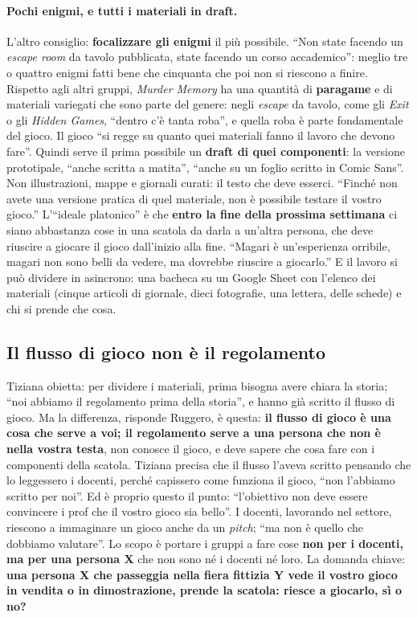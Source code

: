 \paragraph{Pochi enigmi, e tutti i materiali in draft.} L'altro consiglio: \textbf{focalizzare
gli enigmi} il più possibile. ``Non state facendo un \emph{escape room} da tavolo
pubblicata, state facendo un corso accademico'': meglio tre o quattro enigmi fatti bene che
cinquanta che poi non si riescono a finire. Rispetto agli altri gruppi, \emph{Murder Memory}
ha una quantità di \textbf{paragame} e di materiali variegati che sono parte del genere:
negli \emph{escape} da tavolo, come gli \emph{Exit} o gli \emph{Hidden Games}, ``dentro c'è
tanta roba'', e quella roba è parte fondamentale del gioco. Il gioco ``si regge su quanto
quei materiali fanno il lavoro che devono fare''. Quindi serve il prima possibile un
\textbf{draft di quei componenti}: la versione prototipale, ``anche scritta a matita'',
``anche su un foglio scritto in Comic Sans''. Non illustrazioni, mappe e giornali curati:
il testo che deve esserci. ``Finché non avete una versione pratica di quel materiale, non
è possibile testare il vostro gioco.'' L'``ideale platonico'' è che \textbf{entro la fine
della prossima settimana} ci siano abbastanza cose in una scatola da darla a un'altra
persona, che deve riuscire a giocare il gioco dall'inizio alla fine. ``Magari è
un'esperienza orribile, magari non sono belli da vedere, ma dovrebbe riuscire a giocarlo.''
E il lavoro si può dividere in asincrono: una bacheca su un Google Sheet con l'elenco dei
materiali (cinque articoli di giornale, dieci fotografie, una lettera, delle schede) e
chi si prende che cosa.

\subsection{Il flusso di gioco non è il regolamento}

Tiziana obietta: per dividere i materiali, prima bisogna avere chiara la storia; ``noi
abbiamo il regolamento prima della storia'', e hanno già scritto il flusso di gioco. Ma la
differenza, risponde Ruggero, è questa: \textbf{il flusso di gioco è una cosa che serve a
voi; il regolamento serve a una persona che non è nella vostra testa}, non conosce il
gioco, e deve sapere che cosa fare con i componenti della scatola. Tiziana precisa che il
flusso l'aveva scritto pensando che lo leggessero i docenti, perché capissero come funziona
il gioco, ``non l'abbiamo scritto per noi''. Ed è proprio questo il punto: ``l'obiettivo
non deve essere convincere i prof che il vostro gioco sia bello''. I docenti, lavorando nel
settore, riescono a immaginare un gioco anche da un \emph{pitch}; ``ma non è quello che
dobbiamo valutare''. Lo scopo è portare i gruppi a fare cose \textbf{non per i docenti, ma
per una persona X} che non sono né i docenti né loro. La domanda chiave: \textbf{una
persona X che passeggia nella fiera fittizia Y vede il vostro gioco in vendita o in
dimostrazione, prende la scatola: riesce a giocarlo, sì o no?}

